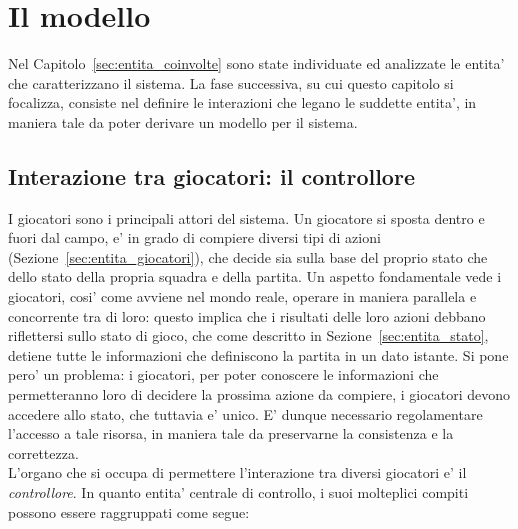 
\section*{Il modello}
%
\label{sec:modello}

Nel Capitolo~\ref{sec:entita_coinvolte} sono state individuate ed analizzate le entita' che caratterizzano il sistema. La fase successiva, su cui questo capitolo si focalizza, consiste nel definire le interazioni che legano le suddette entita', in maniera tale da poter derivare un modello per il sistema.

\subsection*{Interazione tra giocatori: il controllore}
%
\label{sec:modello_interazione_giocatori}

I giocatori sono i principali attori del sistema. Un giocatore si sposta dentro e fuori dal campo, e' in grado di compiere diversi tipi di azioni (Sezione~\ref{sec:entita_giocatori}), che decide sia sulla base del proprio stato che dello stato della propria squadra e della partita. Un aspetto fondamentale vede i giocatori, cosi' come avviene nel mondo reale, operare in maniera parallela e concorrente tra di loro: questo implica che i risultati delle loro azioni debbano riflettersi sullo stato di gioco, che come descritto in Sezione~\ref{sec:entita_stato}, detiene tutte le informazioni che definiscono la partita in un dato istante. Si pone pero' un problema: i giocatori, per poter conoscere le informazioni che permetteranno loro di decidere la prossima azione da compiere, i giocatori devono accedere allo stato, che tuttavia e' unico. E' dunque necessario regolamentare l'accesso a tale risorsa, in maniera tale da preservarne la consistenza e la correttezza.\\

L'organo che si occupa di permettere l'interazione tra diversi giocatori e' il \textit{controllore}. In quanto entita' centrale di controllo, i suoi molteplici compiti possono essere raggruppati come segue:

